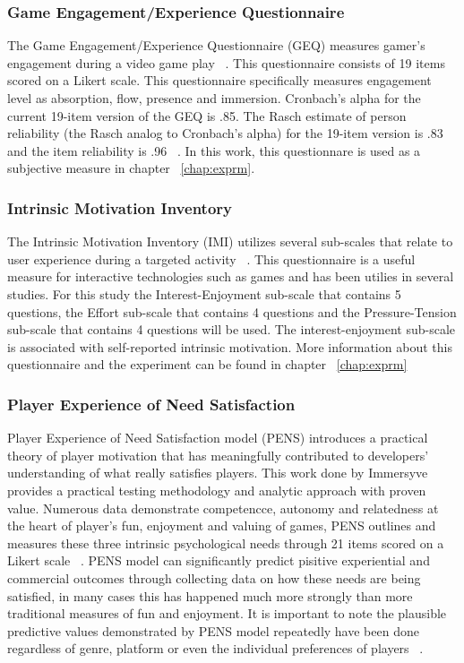 \subsubsection{Game Engagement/Experience Questionnaire}
The Game Engagement/Experience Questionnaire (GEQ) measures gamer's engagement during a video game play ~\cite{brockmyer2009development}. This questionnaire consists of 19 items scored on a Likert scale. This questionnaire specifically measures engagement level as absorption, flow, presence and immersion. Cronbach’s alpha for the current 19-item version of the GEQ is .85. The Rasch estimate of person reliability (the Rasch analog to Cronbach’s alpha) for the 19-item version is .83 and the item reliability is .96 ~\cite{brockmyer2009development}. In this work, this questionnare is used as a subjective measure in chapter ~\ref{chap:exprm}.

\subsubsection{Intrinsic Motivation Inventory}
The Intrinsic Motivation Inventory (IMI) utilizes several sub-scales that relate to user experience during a targeted activity ~\cite{ryan1983relation}. This questionnaire is a useful measure for interactive technologies such as games and has been utilies in several studies. For this study the Interest-Enjoyment sub-scale that contains 5 questions, the Effort sub-scale that contains 4 questions and the Pressure-Tension sub-scale that contains 4 questions will be used. The interest-enjoyment sub-scale is associated with self-reported intrinsic motivation. More information about this questionnaire and the experiment can be found in chapter ~\ref{chap:exprm}

\subsubsection{Player Experience of Need Satisfaction}
Player Experience of Need Satisfaction model (PENS) introduces a practical theory of player motivation that has meaningfully contributed to developers' understanding of what really satisfies players. This work done by Immersyve ~\cite{rigby2007pens} provides a practical testing methodology and analytic approach with proven value. Numerous data demonstrate competencce, autonomy and relatedness at the heart of player's fun, enjoyment and valuing of games, PENS outlines and measures these three intrinsic psychological needs through 21 items scored on a Likert scale ~\cite{rigby2007pens}. PENS model can significantly predict pisitive experiential and commercial outcomes through collecting data on how these needs are being satisfied, in many cases this has happened much more strongly than more traditional measures of fun and enjoyment. It is important to note the plausible predictive values demonstrated by PENS model repeatedly have been done regardless of genre, platform or even the individual preferences of players ~\cite{rigby2007pens}.

